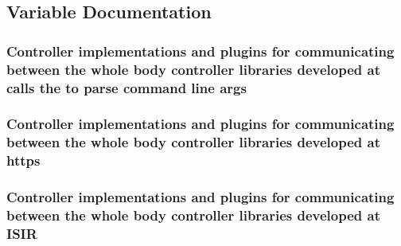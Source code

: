 \subsection{\-Variable \-Documentation}
\hypertarget{README_8md_ae7fe72c1608a83b1bac9259edeb8d53d}{
\subsubsection[{args}]{\setlength{\rightskip}{0pt plus 5cm}\-Controller implementations and plugins for communicating between the whole body controller libraries developed at calls the to parse command line {\bf args}}}\label{README_8md_ae7fe72c1608a83b1bac9259edeb8d53d}
\hypertarget{README_8md_a504ae18f7038ea6e495dcd4d13a5039d}{
\subsubsection[{https}]{\setlength{\rightskip}{0pt plus 5cm}\-Controller implementations and plugins for communicating between the whole body controller libraries developed at {\bf https}}}\label{README_8md_a504ae18f7038ea6e495dcd4d13a5039d}
\hypertarget{README_8md_a5b08a8c96b07654a96b4a53b36d91f57}{
\subsubsection[{\-I\-S\-I\-R}]{\setlength{\rightskip}{0pt plus 5cm}\-Controller implementations and plugins for communicating between the whole body controller libraries developed at {\bf \-I\-S\-I\-R}}}\label{README_8md_a5b08a8c96b07654a96b4a53b36d91f57}
